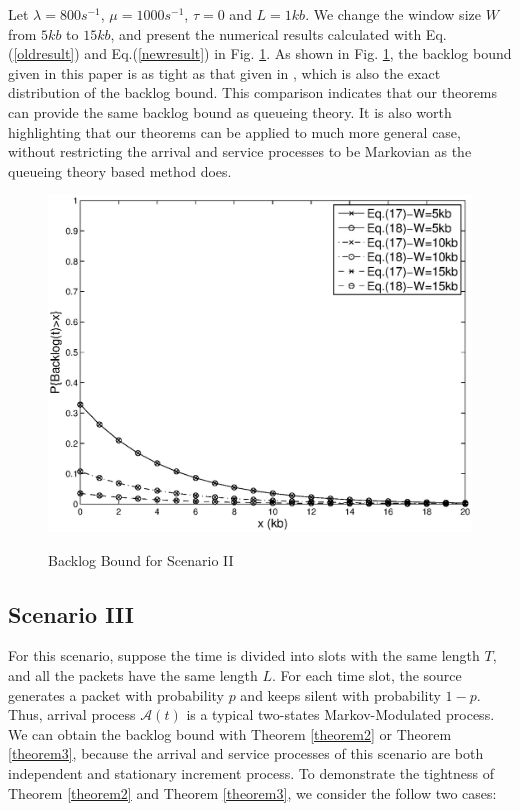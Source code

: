 \documentclass[12pt]{article}
\begin{document}
Let $\lambda=800s^{-1}$, $\mu=1000s^{-1}$, $\tau=0$ and $L=1kb$. We change the window size $W$ from $5kb$ to $15kb$, and present the numerical results calculated with Eq.(\ref{oldresult}) and Eq.(\ref{newresult}) in Fig. \ref{result3}. As shown in Fig. \ref{result3}, the backlog bound given in this paper is as tight as that given in \cite{jung1996analysis}, which is also the exact distribution of the backlog bound. This comparison indicates that our theorems can provide the same backlog bound as queueing theory. It is also worth highlighting that our theorems can be applied to much more general case, without restricting the arrival and service processes to be Markovian as the queueing theory based method does.
\begin{figure}
  \centering
  \includegraphics[scale=0.45]{figures/backlogcomp.eps}\\
  \caption{Backlog Bound for Scenario II}\label{result3}
\end{figure}

\subsection{Scenario III}
For this scenario, suppose the time is divided into slots with the same length $T$, and all the packets have the same length $L$. For each time slot, the source generates a packet with probability $p$ and keeps silent with probability $1-p$. Thus, arrival process $\mathcal{A}(t)$ is a typical two-states Markov-Modulated process. We can obtain the backlog bound with Theorem \ref{theorem2} or Theorem \ref{theorem3}, because the arrival and service processes of this scenario are both independent and stationary increment process. To demonstrate the tightness of Theorem \ref{theorem2} and Theorem \ref{theorem3}, we consider the follow two cases:
\end{document}

